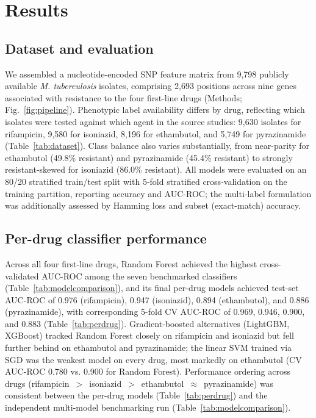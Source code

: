 \section{Results}

\subsection{Dataset and evaluation}

We assembled a nucleotide-encoded SNP feature matrix from 9{,}798 publicly available \emph{M. tuberculosis} isolates, comprising 2{,}693 positions across nine genes associated with resistance to the four first-line drugs (Methods; Fig.~\ref{fig:pipeline}). Phenotypic label availability differs by drug, reflecting which isolates were tested against which agent in the source studies: 9{,}630 isolates for rifampicin, 9{,}580 for isoniazid, 8{,}196 for ethambutol, and 5{,}749 for pyrazinamide (Table~\ref{tab:dataset}). Class balance also varies substantially, from near-parity for ethambutol (49.8\% resistant) and pyrazinamide (45.4\% resistant) to strongly resistant-skewed for isoniazid (86.0\% resistant). All models were evaluated on an 80/20 stratified train/test split with 5-fold stratified cross-validation on the training partition, reporting accuracy and AUC-ROC; the multi-label formulation was additionally assessed by Hamming loss and subset (exact-match) accuracy.



\subsection{Per-drug classifier performance}

Across all four first-line drugs, Random Forest achieved the highest cross-validated AUC-ROC among the seven benchmarked classifiers (Table~\ref{tab:modelcomparison}), and its final per-drug models achieved test-set AUC-ROC of 0.976 (rifampicin), 0.947 (isoniazid), 0.894 (ethambutol), and 0.886 (pyrazinamide), with corresponding 5-fold CV AUC-ROC of 0.969, 0.946, 0.900, and 0.883 (Table~\ref{tab:perdrug}). Gradient-boosted alternatives (LightGBM, XGBoost) tracked Random Forest closely on rifampicin and isoniazid but fell further behind on ethambutol and pyrazinamide; the linear SVM trained via SGD was the weakest model on every drug, most markedly on ethambutol (CV AUC-ROC 0.780 vs. 0.900 for Random Forest). Performance ordering across drugs (rifampicin~$>$~isoniazid~$>$~ethambutol~$\approx$~pyrazinamide) was consistent between the per-drug models (Table~\ref{tab:perdrug}) and the independent multi-model benchmarking run (Table~\ref{tab:modelcomparison}).

